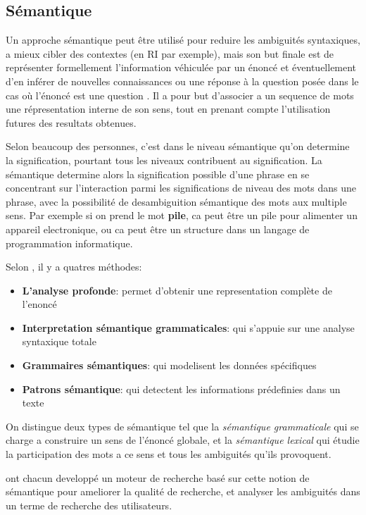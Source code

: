 \subsection{Sémantique}
Un approche sémantique peut être utilisé pour reduire les ambiguités syntaxiques, a mieux cibler des contextes (en RI par exemple), mais son but finale est de représenter formellement l’information véhiculée par un énoncé et éventuellement d’en inférer de nouvelles connaissances ou une réponse à la question posée dans le cas où l'énoncé est une question \citep{automatic-nlp}. Il a pour but d'associer a un sequence de mots une répresentation interne de son sens, tout en prenant compte l'utilisation futures des resultats obtenues.

Selon beaucoup des personnes, c'est dans le niveau sémantique qu'on determine la signification, pourtant tous les niveaux contribuent au signification. La sémantique determine alors la signification possible d'une phrase en se concentrant sur l'interaction parmi les significations de niveau des mots dans une phrase, avec la possibilité de desambiguition sémantique des mots aux multiple sens. Par exemple si on prend le mot \textbf{pile}, ca peut être un pile pour alimenter un appareil electronique, ou ca peut être un structure dans un langage de programmation informatique.

Selon \citeauthor{automatic-nlp}, il y a quatres méthodes:
\begin{itemize}
    \item \textbf{L'analyse profonde}: permet d'obtenir une representation complète de l'enoncé
    \item \textbf{Interpretation sémantique grammaticales}: qui s'appuie sur une analyse syntaxique totale
    \item \textbf{Grammaires sémantiques}: qui modelisent les données spécifiques
    \item \textbf{Patrons sémantique}: qui detectent les informations prédefinies dans un texte
\end{itemize}

On distingue deux types de sémantique tel que la \textit{sémantique grammaticale} qui se charge a construire un sens de l'énoncé globale, et la \textit{sémantique lexical} qui étudie la participation des mots a ce sens et tous les ambiguités qu'ils provoquent.

\citeauthor{amelioration-ri-approche-semantique,approche-semantique} \citep{amelioration-ri-approche-semantique,approche-semantique} ont chacun developpé un moteur de recherche basé sur cette notion de sémantique pour ameliorer la qualité de recherche, et analyser les ambiguités dans un terme de recherche des utilisateurs.

